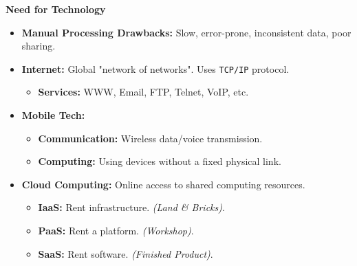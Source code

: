\documentclass[a4paper, 8pt]{extarticle}
\newcommand{\subsectionheading}[1]{\normalsize\textbf{#1}}
\begin{document}
\begin{multicols}{2}
\subsectionheading{Need for Technology}
\begin{itemize}
    \item \textbf{Manual Processing Drawbacks:} Slow, error-prone, inconsistent data, poor sharing.
    \item \textbf{Internet:} Global "network of networks". Uses \texttt{TCP/IP} protocol.
    \begin{itemize}
        \item \textbf{Services:} WWW, Email, FTP, Telnet, VoIP, etc.
    \end{itemize}
    \item \textbf{Mobile Tech:}
        \begin{itemize}
            \item \textbf{Communication:} Wireless data/voice transmission.
            \item \textbf{Computing:} Using devices without a fixed physical link.
        \end{itemize}
    \item \textbf{Cloud Computing:} Online access to shared computing resources.
    \begin{itemize}
        \item \textbf{IaaS:} Rent infrastructure. \textit {(Land  \& Bricks)}.
        \item \textbf{PaaS:} Rent a platform. \textit{(Workshop)}.
        \item \textbf{SaaS:} Rent software. \textit{(Finished Product)}.
    \end{itemize}
\end{itemize}


\end{multicols}
\end{document}
